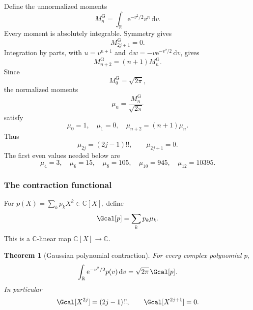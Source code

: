 \documentclass[11pt,oneside]{article}
\newtheorem{theorem}{Theorem}[section]
\theoremstyle{definition}
\theoremstyle{remark}
\newcommand{\R}{\mathbb R}
\newcommand{\C}{\mathbb C}
\newcommand{\e}{\mathrm e}
\newcommand{\dd}{\,\mathrm d}
\begin{document}
Define the unnormalized moments
\begin{equation}
 M_n^{\mathrm G}=\int_{\R}\e^{-v^2/2}v^n\dd v.
 \label{integration:eq:real-gaussian-moment}
\end{equation}
Every moment is absolutely integrable.  Symmetry gives
\begin{equation}
 M_{2j+1}^{\mathrm G}=0.
 \label{integration:eq:gaussian-odd-zero}
\end{equation}
Integration by parts, with $u=v^{n+1}$ and
$\dd w=-v\e^{-v^2/2}\dd v$, gives
\begin{equation}
 M_{n+2}^{\mathrm G}=(n+1)M_n^{\mathrm G}.
 \label{integration:eq:gaussian-moment-recurrence}
\end{equation}
Since
\begin{equation}
 M_0^{\mathrm G}=\sqrt{2\pi},
 \label{integration:eq:gaussian-moment-zero}
\end{equation}
the normalized moments
\begin{equation}
 \mu_n=\frac{M_n^{\mathrm G}}{\sqrt{2\pi}}
 \label{integration:eq:normalized-gaussian-moment}
\end{equation}
satisfy
\begin{equation}
 \mu_0=1,
 \quad
 \mu_1=0,
 \quad
 \mu_{n+2}=(n+1)\mu_n.
 \label{integration:eq:normalized-gaussian-recurrence}
\end{equation}
Thus
\begin{equation}
 \mu_{2j}=(2j-1)!!,
 \qquad
 \mu_{2j+1}=0.
 \label{integration:eq:normalized-gaussian-closed}
\end{equation}
The first even values needed below are
\begin{equation}
 \mu_4=3,
 \quad
 \mu_6=15,
 \quad
 \mu_8=105,
 \quad
 \mu_{10}=945,
 \quad
 \mu_{12}=10395.
 \label{integration:eq:gaussian-moments-second-correction}
\end{equation}

\subsubsection{The contraction functional}

For $p(X)=\sum_kp_kX^k\in\C[X]$, define
\begin{equation}
 \Gcal[p]=\sum_kp_k\mu_k.
 \label{integration:eq:gaussian-contraction-def}
\end{equation}
This is a $\C$-linear map $\C[X]\to\C$.

\begin{theorem}[Gaussian polynomial contraction]
\label{integration:thm:gaussian-contraction}
For every complex polynomial $p$,
\begin{equation}
 \int_{\R}\e^{-v^2/2}p(v)\dd v
 =\sqrt{2\pi}\,\Gcal[p].
 \label{integration:eq:gaussian-contraction-integral}
\end{equation}
In particular
\begin{equation}
 \Gcal[X^{2j}]=(2j-1)!!,
 \qquad
 \Gcal[X^{2j+1}]=0.
 \label{integration:eq:gaussian-contraction-monomials}
\end{equation}
\end{theorem}
\end{document}
